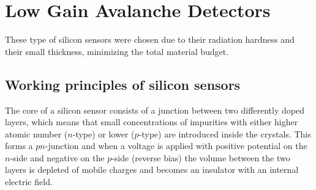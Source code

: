 \section{Low Gain Avalanche Detectors}


These type of silicon sensors were chosen due to their radiation hardness and their small thickness, minimizing the total material budget. 

\subsection{Working principles of silicon sensors}

The core of a silicon sensor consists of a junction between two differently doped layers, which means that small concentrations of impurities with either higher atomic number ($n$-type) or lower ($p$-type) are introduced inside the crystals.
This forms a $pn$-junction and when a voltage is applied with positive potential on the $n$-side and negative on the $p$-side (reverse bias) the volume between the two layers is depleted of mobile charges and becomes an insulator with an internal electric field.


